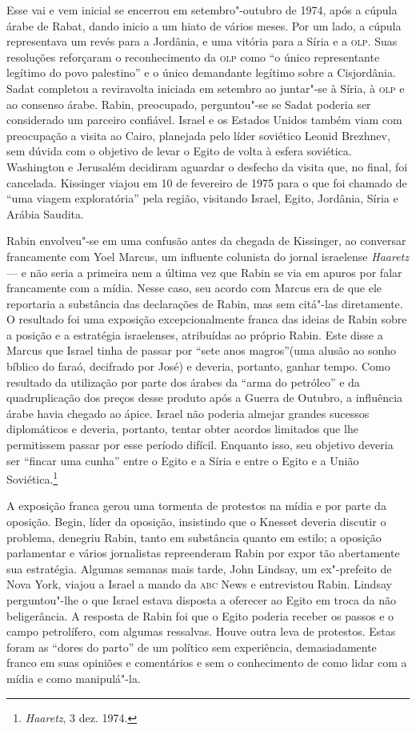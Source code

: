 Esse vai e vem inicial se encerrou em setembro"-outubro de 1974, após a
cúpula árabe de Rabat, dando inicio a um hiato de vários meses. Por um
lado, a cúpula representava um revés para a Jordânia, e uma vitória para
a Síria e a \textsc{olp}. Suas resoluções reforçaram o reconhecimento da \textsc{olp} como
``o único representante legítimo do povo palestino'' e o único
demandante legítimo sobre a Cisjordânia. Sadat completou a reviravolta
iniciada em setembro ao juntar"-se à Síria, à \textsc{olp} e ao consenso árabe.
Rabin, preocupado, perguntou"-se se Sadat poderia ser considerado um
parceiro confiável. Israel e os Estados Unidos também viam com
preocupação a visita ao Cairo, planejada pelo líder soviético Leonid
Brezhnev, sem dúvida com o objetivo de levar o Egito de volta à esfera
soviética. Washington e Jerusalém decidiram aguardar o desfecho da
visita que, no final, foi cancelada. Kissinger viajou em 10 de fevereiro
de 1975 para o que foi chamado de ``uma viagem exploratória'' pela
região, visitando Israel, Egito, Jordânia, Síria e Arábia Saudita.

Rabin envolveu"-se em uma confusão antes da chegada de Kissinger, ao
conversar francamente com Yoel Marcus, um influente colunista do jornal
israelense \textit{Haaretz} --- e não seria a primeira nem a última
vez que Rabin se via em apuros por falar francamente com a mídia.
Nesse caso, seu acordo com Marcus era de que ele reportaria a substância
das declarações de Rabin, mas sem citá"-las diretamente. O resultado foi
uma exposição excepcionalmente franca das ideias de Rabin sobre a
posição e a estratégia israelenses, atribuídas ao próprio Rabin. Este
disse a Marcus que Israel tinha de passar por ``sete anos magros''(uma
alusão ao sonho bíblico do faraó, decifrado por José) e deveria,
portanto, ganhar tempo. Como resultado da utilização por parte dos
árabes da ``arma do petróleo'' e da quadruplicação dos preços desse
produto após a Guerra de Outubro, a influência árabe havia chegado ao
ápice. Israel não poderia almejar grandes sucessos diplomáticos e
deveria, portanto, tentar obter acordos limitados que lhe permitissem
passar por esse período difícil. Enquanto isso, seu objetivo deveria ser
``fincar uma cunha'' entre o Egito e a Síria e entre o Egito e a União
Soviética.\footnote{\textit{Haaretz}, 3 dez. 1974.}

A exposição franca gerou uma tormenta de protestos na mídia e por parte
da oposição. Begin, líder da oposição, insistindo que o Knesset deveria
discutir o problema, denegriu Rabin, tanto em substância quanto em
estilo; a oposição parlamentar e vários jornalistas repreenderam Rabin
por expor tão abertamente sua estratégia. Algumas semanas mais tarde,
John Lindsay, um ex"-prefeito de Nova York, viajou a Israel a mando da
\textsc{abc} News e entrevistou Rabin. Lindsay perguntou"-lhe o que Israel estava
disposta a oferecer ao Egito em troca da não beligerância. A resposta de
Rabin foi que o Egito poderia receber os passos e o campo petrolífero,
com algumas ressalvas. Houve outra leva de protestos. Estas foram as
``dores do parto'' de um político sem experiência, demasiadamente franco
em suas opiniões e comentários e sem o conhecimento de como lidar com a
mídia e como manipulá"-la.

